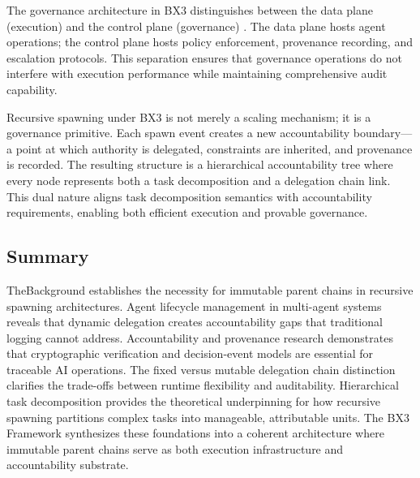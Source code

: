 The governance architecture in BX3 distinguishes between the data plane (execution) and the control plane (governance) \cite{bxai_governance}. The data plane hosts agent operations; the control plane hosts policy enforcement, provenance recording, and escalation protocols. This separation ensures that governance operations do not interfere with execution performance while maintaining comprehensive audit capability.

Recursive spawning under BX3 is not merely a scaling mechanism; it is a governance primitive. Each spawn event creates a new accountability boundary—a point at which authority is delegated, constraints are inherited, and provenance is recorded. The resulting structure is a hierarchical accountability tree where every node represents both a task decomposition and a delegation chain link. This dual nature aligns task decomposition semantics with accountability requirements, enabling both efficient execution and provable governance.

\subsection{Summary}

TheBackground establishes the necessity for immutable parent chains in recursive spawning architectures. Agent lifecycle management in multi-agent systems reveals that dynamic delegation creates accountability gaps that traditional logging cannot address. Accountability and provenance research demonstrates that cryptographic verification and decision-event models are essential for traceable AI operations. The fixed versus mutable delegation chain distinction clarifies the trade-offs between runtime flexibility and auditability. Hierarchical task decomposition provides the theoretical underpinning for how recursive spawning partitions complex tasks into manageable, attributable units. The BX3 Framework synthesizes these foundations into a coherent architecture where immutable parent chains serve as both execution infrastructure and accountability substrate.

